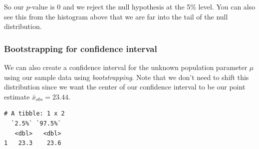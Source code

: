 \documentclass[12pt,]{krantz}
\makeatletter
\newenvironment{Shaded}{\begin{snugshade}}{\end{snugshade}}
\newcommand{\KeywordTok}[1]{\textcolor[rgb]{0.27,0.27,0.27}{\textbf{#1}}}
\newcommand{\DataTypeTok}[1]{\textcolor[rgb]{0.27,0.27,0.27}{#1}}
\newcommand{\DecValTok}[1]{\textcolor[rgb]{0.06,0.06,0.06}{#1}}
\newcommand{\StringTok}[1]{\textcolor[rgb]{0.5,0.5,0.5}{#1}}
\newcommand{\OperatorTok}[1]{\textcolor[rgb]{0.43,0.43,0.43}{\textbf{#1}}}
\newcommand{\NormalTok}[1]{#1}
\newenvironment{kframe}{%
\medskip{}
\setlength{\fboxsep}{.8em}
 \def\at@end@of@kframe{}%
 \ifinner\ifhmode%
  \def\at@end@of@kframe{\end{minipage}}%
  \begin{minipage}{\columnwidth}%
 \fi\fi%
 \def\FrameCommand##1{\hskip\@totalleftmargin \hskip-\fboxsep
 \colorbox{shadecolor}{##1}\hskip-\fboxsep
     \hskip-\linewidth \hskip-\@totalleftmargin \hskip\columnwidth}%
 \MakeFramed {\advance\hsize-\width
   \@totalleftmargin\z@ \linewidth\hsize
   \@setminipage}}%
 {\par\unskip\endMakeFramed%
 \at@end@of@kframe}
\renewenvironment{Shaded}{\begin{kframe}}{\end{kframe}}
\theoremstyle{definition}
\theoremstyle{definition}
\theoremstyle{definition}
\theoremstyle{remark}
\makeatother
\begin{document}
So our \(p\)-value is 0 and we reject the null hypothesis at the 5\%
level. You can also see this from the histogram above that we are far
into the tail of the null distribution.

\subsubsection*{Bootstrapping for confidence
interval}\label{bootstrapping-for-confidence-interval}

We can also create a confidence interval for the unknown population
parameter \(\mu\) using our sample data using \emph{bootstrapping}. Note
that we don't need to shift this distribution since we want the center
of our confidence interval to be our point estimate
\(\bar{x}_{obs} = 23.44\).

\begin{Shaded}
\end{Shaded}

\begin{Shaded}
\end{Shaded}

\begin{verbatim}
# A tibble: 1 x 2
  `2.5%` `97.5%`
   <dbl>   <dbl>
1   23.3    23.6
\end{verbatim}

\begin{Shaded}
\end{Shaded}
\end{document}
